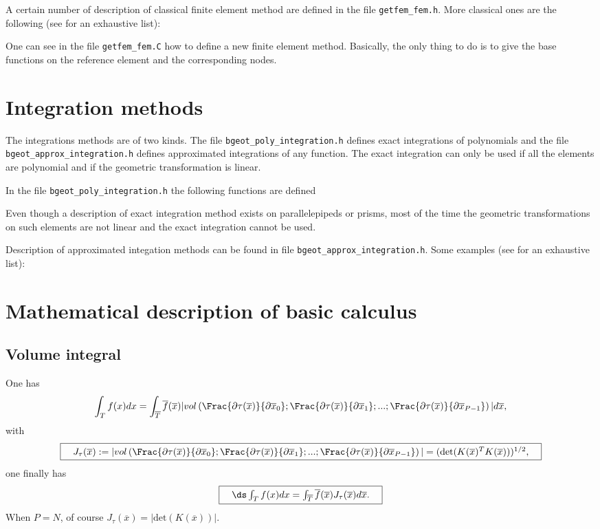 \documentclass[11pt,a4paper]{article}
\begin{document}
A certain number of description of classical finite element method are defined in the file {\tt getfem\_fem.h}. More classical ones are the following (see \cite{FEM_LIST} for an exhaustive list):



One can see in the file {\tt getfem\_fem.C} how to define a new finite element method. Basically, the only thing to do is to give the base functions on the reference element and the corresponding nodes.

\section{Integration methods}

The integrations methods are of two kinds. The file {\tt bgeot\_poly\_integration.h} defines exact integrations of polynomials and the file {\tt bgeot\_approx\_integration.h} defines approximated integrations of any function. The exact integration can only be used if all the elements are polynomial and if the geometric transformation is linear.

In the file {\tt bgeot\_poly\_integration.h} the following functions are defined



Even though a description of exact integration method exists on parallelepipeds or prisms, most of the time the geometric transformations on such elements are not linear and the exact integration cannot be used.

Description of approximated integation methods can be found in file {\tt bgeot\_approx\_integration.h}. Some examples (see \cite{FEM_LIST} for an exhaustive list):



\section{Mathematical description of basic calculus}

\subsection{Volume integral}
One has
$$ \int_T f(x) dx = \int_{\overline{T}} \overline{f}(\overline{x}) |vol\left(\Frac{\partial \tau(\overline{x})}{\partial \overline{x}_0} ;\Frac{\partial \tau(\overline{x})}{\partial \overline{x}_1}; ...; \Frac{\partial \tau(\overline{x})}{\partial \overline{x}_{P-1} }\right)| d\overline{x}, $$
with
$$ \fbox{$\hspace{1em} J_{\tau}(\overline{x}) := |vol\left(\Frac{\partial \tau(\overline{x})}{\partial \overline{x}_0} ;\Frac{\partial \tau(\overline{x})}{\partial \overline{x}_1}; ...; \Frac{\partial \tau(\overline{x})}{\partial \overline{x}_{P-1} }\right)| = (\mbox{det}(K(\overline{x})^T K(\overline{x})))^{1/2},\hspace{1em}$} $$
one finally has
$$ \fbox{$\hspace{1em} \ds \int_T f(x) dx = \int_{\overline{T}} \overline{f}(\overline{x})  J_{\tau}(\overline{x})d\overline{x}.\hspace{1em}$} $$
When $P = N$, of course $J_{\tau}(\overline{x}) = |\mbox{det}(K(\overline{x}))|$.
\end{document}
